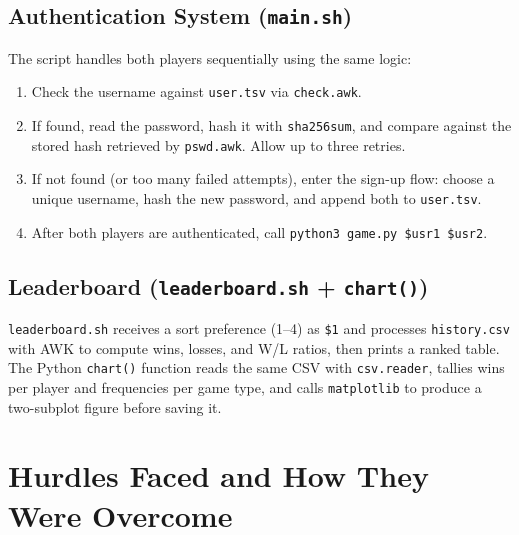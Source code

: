 \documentclass[12pt]{article}
\begin{document}
\subsection{Authentication System (\texttt{main.sh})}

The script handles both players sequentially using the same logic:
\begin{enumerate}
    \item Check the username against \texttt{user.tsv} via \texttt{check.awk}.
    \item If found, read the password, hash it with \texttt{sha256sum}, and compare against the stored hash retrieved by \texttt{pswd.awk}. Allow up to three retries.
    \item If not found (or too many failed attempts), enter the sign-up flow: choose a unique username, hash the new password, and append both to \texttt{user.tsv}.
    \item After both players are authenticated, call \texttt{python3 game.py \$usr1 \$usr2}.
\end{enumerate}

\subsection{Leaderboard (\texttt{leaderboard.sh} + \texttt{chart()})}

\texttt{leaderboard.sh} receives a sort preference (1--4) as \texttt{\$1} and processes \texttt{history.csv} with AWK to compute wins, losses, and W/L ratios, then prints a ranked table. The Python \texttt{chart()} function reads the same CSV with \texttt{csv.reader}, tallies wins per player and frequencies per game type, and calls \texttt{matplotlib} to produce a two-subplot figure before saving it.

\section{Hurdles Faced and How They Were Overcome}
\end{document}
